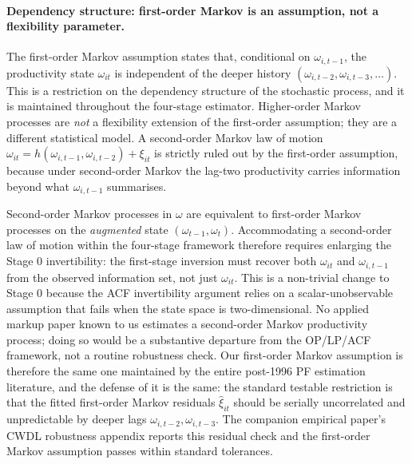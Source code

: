 \documentclass[11pt]{article}
\begin{document}
\paragraph{Dependency structure: first-order Markov is an assumption, not a flexibility parameter.} The first-order Markov assumption states that, conditional on $\omega_{i,t-1}$, the productivity state $\omega_{it}$ is independent of the deeper history $(\omega_{i,t-2}, \omega_{i,t-3}, \ldots)$. This is a restriction on the dependency structure of the stochastic process, and it is maintained throughout the four-stage estimator. Higher-order Markov processes are \emph{not} a flexibility extension of the first-order assumption; they are a different statistical model. A second-order Markov law of motion $\omega_{it} = h(\omega_{i,t-1}, \omega_{i,t-2}) + \xi_{it}$ is strictly ruled out by the first-order assumption, because under second-order Markov the lag-two productivity carries information beyond what $\omega_{i,t-1}$ summarises.

Second-order Markov processes in $\omega$ are equivalent to first-order Markov processes on the \emph{augmented} state $(\omega_{t-1}, \omega_t)$. Accommodating a second-order law of motion within the four-stage framework therefore requires enlarging the Stage 0 invertibility: the first-stage inversion must recover both $\omega_{it}$ and $\omega_{i,t-1}$ from the observed information set, not just $\omega_{it}$. This is a non-trivial change to Stage 0 because the ACF invertibility argument relies on a scalar-unobservable assumption that fails when the state space is two-dimensional. No applied markup paper known to us estimates a second-order Markov productivity process; doing so would be a substantive departure from the OP/LP/ACF framework, not a routine robustness check. Our first-order Markov assumption is therefore the same one maintained by the entire post-1996 PF estimation literature, and the defense of it is the same: the standard testable restriction is that the fitted first-order Markov residuals $\hat\xi_{it}$ should be serially uncorrelated and unpredictable by deeper lags $\omega_{i,t-2}, \omega_{i,t-3}$. The companion empirical paper's CWDL robustness appendix reports this residual check and the first-order Markov assumption passes within standard tolerances.
\end{document}
